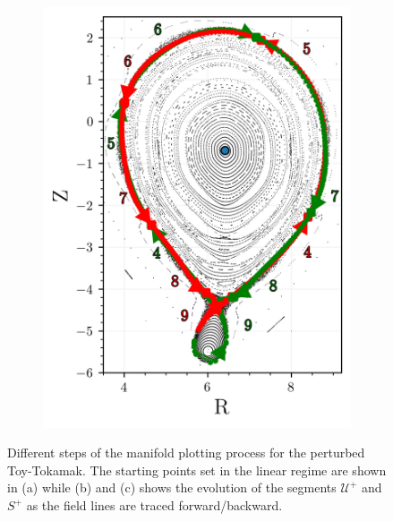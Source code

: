 \begin{figure}[H]
\begin{minipage}{0.45\textwidth}
\begin{subfigure}[b]{0.99\textwidth}
            \caption{}
            \label{fig:man-b}
        \end{subfigure}
    \end{minipage}%
    \begin{minipage}{0.5\textwidth} %
        \centering
        \begin{subfigure}[b]{\textwidth}
            \centering
            \includegraphics[width=\textwidth]{images/manifold/manifold.png}
            \caption{}
            \label{fig:man-c}
        \end{subfigure}
    \end{minipage}
    \caption{Different steps of the manifold plotting process for the perturbed Toy-Tokamak. The starting points set in the linear regime are shown in (a) while (b) and (c) shows the evolution of the segments $\mathcal{U}^+$ and $S^+$ as the field lines are traced forward/backward.}
    \label{fig:manifold-algo}
\end{figure}

